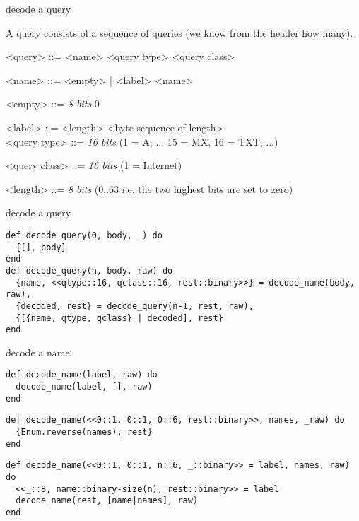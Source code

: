 \begin{frame}{decode a query}

A query consists of a sequence of queries (we know from the header how many).

\begin{grammar}
<query> ::= <name> <query type> <query class>

<name> ::= <empty> | <label> <name>

<empty> ::=  {\em 8 bits} 0 

<label> ::=  <length> <byte sequence of length> \\

<query type> ::= {\em 16 bits}  (1 = A, ... 15 = MX, 16 = TXT, ...)

<query class> ::= {\em 16 bits} (1 = Internet)

<length> ::= {\em 8 bits}  (0..63 i.e. the two highest bits are set to zero)

\end{grammar}


\end{frame}

\begin{frame}[fragile]{decode a query}

\begin{verbatim}
def decode_query(0, body, _) do
  {[], body}
end
def decode_query(n, body, raw) do
  {name, <<qtype::16, qclass::16, rest::binary>>} = decode_name(body, raw),
  {decoded, rest} = decode_query(n-1, rest, raw),
  {[{name, qtype, qclass} | decoded], rest}
end
\end{verbatim}

\end{frame}


\begin{frame}[fragile]{decode a name}

  
\begin{verbatim}
def decode_name(label, raw) do
  decode_name(label, [], raw)
end
\end{verbatim}
\begin{verbatim}
def decode_name(<<0::1, 0::1, 0::6, rest::binary>>, names, _raw) do  
  {Enum.reverse(names), rest}
end
\end{verbatim}

\begin{verbatim}
def decode_name(<<0::1, 0::1, n::6, _::binary>> = label, names, raw) do
  <<_::8, name::binary-size(n), rest::binary>> = label
  decode_name(rest, [name|names], raw)
end
\end{verbatim}
\end{frame}



